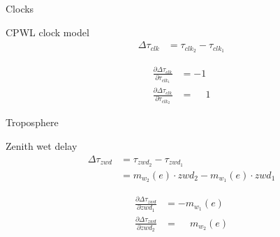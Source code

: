 \documentclass[14pt,table,t, c]{beamer}
\begin{document}
\begin{frame}{Clocks}
\begin{block}{CPWL clock model}
\vspace*{-\baselineskip}\setlength\belowdisplayskip{0pt}\setlength\abovedisplayskip{0pt}
\begin{align*}
\Delta\tau_{clk} &= \tau_{{clk}_2} - \tau_{{clk}_1}
\end{align*}
\end{block}
\begin{block}{\vspace*{-3ex}}
\vspace*{-\baselineskip}\setlength\belowdisplayskip{0pt}\setlength\abovedisplayskip{0pt}
\begin{align*}
\frac{\partial \Delta\tau_{clk}}{\partial \tau_{{clk}_1}} &= -1 \\
\frac{\partial \Delta\tau_{clk}}{\partial \tau_{{clk}_2}} &= \phantom{-}1 
\end{align*}
\end{block}
\end{frame}

\begin{frame}{Troposphere}
\begin{block}{Zenith wet delay}
\vspace*{-\baselineskip}\setlength\belowdisplayskip{0pt}\setlength\abovedisplayskip{0pt}
\begin{align*}
\Delta\tau_{zwd} &= \tau_{{zwd}_2} - \tau_{{zwd}_1}\\
 &= m_{w_2}(e) \cdot zwd_2 - m_{w_1}(e) \cdot zwd_1
\end{align*}
\end{block}
\begin{block}{\vspace*{-3ex}}
\vspace*{-\baselineskip}\setlength\belowdisplayskip{0pt}\setlength\abovedisplayskip{0pt}
\begin{align*}
\frac{\partial \Delta\tau_{zwd}}{\partial {zwd}_1} &= -m_{w_1}(e)\\ 
\frac{\partial \Delta\tau_{zwd}}{\partial {zwd}_2} &= \phantom{-}m_{w_2}(e) 
\end{align*}
\end{block}
\end{frame}
\end{document}
